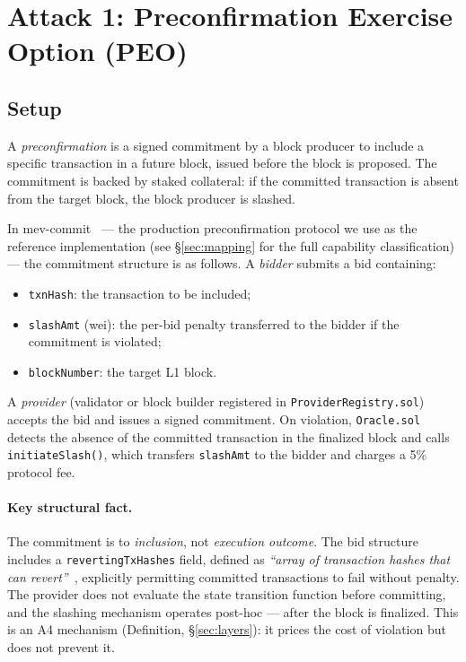 %

\section{Attack 1: Preconfirmation Exercise Option (PEO)}
\label{sec:peo}

\subsection{Setup}
\label{sec:peo-setup}

A \emph{preconfirmation} is a signed commitment by a block producer to include
a specific transaction in a future block, issued before the block is proposed.
The commitment is backed by staked collateral: if the committed transaction is
absent from the target block, the block producer is slashed.

In mev-commit~\cite{MevCommit-Docs} --- the production preconfirmation protocol
we use as the reference implementation (see \S\ref{sec:mapping} for
the full capability classification) --- the commitment structure is as follows. A
\emph{bidder} submits a bid containing:
\begin{itemize}
  \item \texttt{txnHash}: the transaction to be included;
  \item \texttt{slashAmt} (wei): the per-bid penalty transferred to the bidder
    if the commitment is violated;
  \item \texttt{blockNumber}: the target L1 block.
\end{itemize}
A \emph{provider} (validator or block builder registered in
\texttt{ProviderRegistry.sol}) accepts the bid and issues a signed commitment.
On violation, \texttt{Oracle.sol} detects the absence of the committed
transaction in the finalized block and calls \texttt{initiateSlash()}, which
transfers \texttt{slashAmt} to the bidder and charges a 5\% protocol fee.

\paragraph{Key structural fact.}
The commitment is to \emph{inclusion}, not \emph{execution outcome}. The bid
structure includes a \texttt{revertingTxHashes} field, defined as
\emph{``array of transaction hashes that can revert''}~\cite{MevCommit-Docs},
explicitly permitting committed transactions to fail without penalty. The
provider does not evaluate the state transition function before committing,
and the slashing mechanism operates post-hoc --- after the block is finalized.
This is an A4 mechanism (Definition, \S\ref{sec:layers}): it prices the cost
of violation but does not prevent it.

